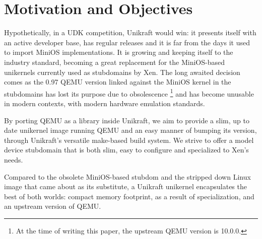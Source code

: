 \chapter{Motivation and Objectives}
\label{chapter:motivation-objectives}

Hypothetically, in a UDK competition, Unikraft would win: it presents itself with an active developer base, has regular releases and it is far from the days it used to import MiniOS implementations.
It is growing and keeping itself to the industry standard, becoming a great replacement for the MiniOS-based unikernels currently used as stubdomains by Xen.
The long awaited decision comes as the 0.97 QEMU version linked against the MiniOS kernel in the stubdomains has lost its purpose due to obsolescence \footnote{At the time of writing this paper, the upstream QEMU version is 10.0.0.} and has become unusable in modern contexts, with modern hardware emulation standards.

By porting QEMU as a library inside Unikraft, we aim to provide a slim, up to date unikernel image running QEMU and an easy manner of bumping its version, through Unikraft's versatile make-based build system.
We strive to offer a model device stubdomain that is both slim, easy to configure and specialized to Xen's needs.

Compared to the obsolete MiniOS-based stubdom and the stripped down Linux image that came about as its substitute, a Unikraft unikernel encapsulates the best of both worlds: compact memory footprint, as a result of specialization, and an upstream version of QEMU.
